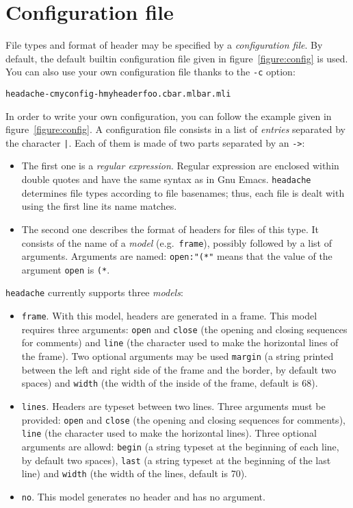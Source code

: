 \documentclass{article}
\newcommand{\headache}{\texttt{headache}}
\begin{document}
\section{Configuration file}

File types and format of header may be specified by a
\emph{configuration file}.  By default, the default builtin
configuration file given in figure~\ref{figure:config} is used.  You
can also use your own configuration file thanks to the \verb+-c+
option:
\begin{alltt}
  headache -c myconfig -h myheader foo.c bar.ml bar.mli
\end{alltt}

In order to write your own configuration, you can follow the example
given in figure~\ref{figure:config}.  A configuration file consists in
a list of \emph{entries} separated by the character \verb+|+.  Each
of them is made of two parts separated by an \verb+->+:
\begin{itemize}
\item The first one is a \emph{regular expression}.  Regular
  expression are enclosed within double quotes and have the same
  syntax as in Gnu Emacs.  \headache{} determines file types according to
  file basenames; thus, each file is dealt with using the first line
  its name matches.
\item The second one describes the format of headers for files of this
  type.  It consists of the name of a \emph{model} (e.g.\ 
  \verb+frame+), possibly followed by a list of arguments.  Arguments
  are named: \verb+open:"(*"+ means that the value of the argument
  \verb+open+ is \verb+(*+.
\end{itemize}
\headache{} currently supports three \emph{models}:
\begin{itemize}
\item \verb+frame+.  With this model, headers are generated in a
  frame.  This model requires three arguments: \verb+open+ and
  \verb+close+ (the opening and closing sequences for comments) and
  \verb+line+ (the character used to make the horizontal lines of the
  frame).  Two optional arguments may be used \verb+margin+ (a string
  printed between the left and right side of the frame and the border,
  by default two spaces) and \verb+width+ (the width of the inside of
  the frame, default is 68).
\item \verb+lines+.  Headers are typeset between two lines.  Three
  arguments must be provided: \verb+open+ and \verb+close+ (the
  opening and closing sequences for comments), \verb+line+ (the
  character used to make the horizontal lines).  Three optional
  arguments are allowd: \verb+begin+ (a string typeset at the
  beginning of each line, by default two spaces), \verb+last+ (a
  string typeset at the beginning of the last line) and \verb+width+
  (the width of the lines, default is 70).
\item \verb+no+.  This model generates no header and has no argument.
\end{itemize}
\end{document}

